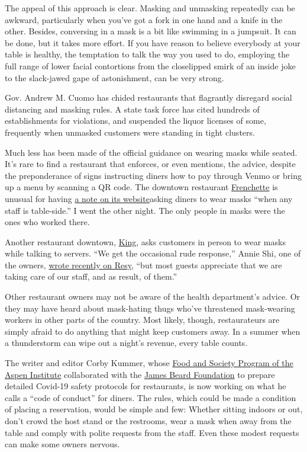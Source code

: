The appeal of this approach is clear. Masking and unmasking repeatedly
can be awkward, particularly when you've got a fork in one hand and a
knife in the other. Besides, conversing in a mask is a bit like swimming
in a jumpsuit. It can be done, but it takes more effort. If you have
reason to believe everybody at your table is healthy, the temptation to
talk the way you used to do, employing the full range of lower facial
contortions from the closelipped smirk of an inside joke to the
slack-jawed gape of astonishment, can be very strong.

Gov. Andrew M. Cuomo has chided restaurants that flagrantly disregard
social distancing and masking rules. A state task force has cited
hundreds of establishments for violations, and suspended the liquor
licenses of some, frequently when unmasked customers were standing in
tight clusters.

Much less has been made of the official guidance on wearing masks while
seated. It's rare to find a restaurant that enforces, or even mentions,
the advice, despite the preponderance of signs instructing diners how to
pay through Venmo or bring up a menu by scanning a QR code. The downtown
restaurant
\href{https://www.nytimes3xbfgragh.onion/2018/07/10/dining/frenchette-review-restaurant-tribeca.html}{Frenchette}
is unusual for having
\href{https://www.frenchettenyc.com/reservations}{a note on its
website}asking diners to wear masks ``when any staff is table-side.'' I
went the other night. The only people in masks were the ones who worked
there.

Another restaurant downtown,
\href{https://www.nytimes3xbfgragh.onion/2017/06/06/dining/king-restaurant-review-soho.html}{King},
asks customers in person to wear masks while talking to servers. ``We
get the occasional rude response,'' Annie Shi, one of the owners,
\href{https://blog.resy.com/2020/07/hospitality-save-restaurants-uncertainty-annie-shi-king/}{wrote
recently on Resy}, ``but most guests appreciate that we are taking care
of our staff, and as result, of them.''

Other restaurant owners may not be aware of the health department's
advice. Or they may have heard about mask-hating thugs who've threatened
mask-wearing workers in other parts of the country. Most likely, though,
restaurateurs are simply afraid to do anything that might keep customers
away. In a summer when a thunderstorm can wipe out a night's revenue,
every table counts.

The writer and editor Corby Kummer, whose
\href{https://www.aspeninstitute.org/programs/food-and-society-program/}{Food
and Society Program of the Aspen Institute} collaborated with the
\href{https://www.jamesbeard.org/}{James Beard Foundation} to prepare
detailed Covid-19 safety protocols for restaurants, is now working on
what he calls a ``code of conduct'' for diners. The rules, which could
be made a condition of placing a reservation, would be simple and few:
Whether sitting indoors or out, don't crowd the host stand or the
restrooms, wear a mask when away from the table and comply with polite
requests from the staff. Even these modest requests can make some owners
nervous.

